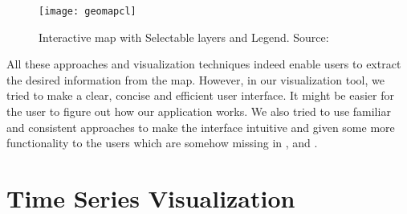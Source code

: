 \begin{figure} [H]
  \begin{center}
    \texttt{[image: geomapcl]}
    \caption{Interactive map with Selectable layers and Legend. Source:\cite{gportal2016}}
    \label{fig:mapgeo}
  \end{center}
\end{figure}

All these approaches and visualization techniques indeed enable users to extract the desired information from the map. However, in our visualization tool, we tried to make a clear, concise and efficient user interface. It might be easier for the user to figure out how our application works. We also tried to use familiar and consistent approaches to make the interface intuitive and given some more functionality to the users which are somehow missing in \cite{cbg2016}, \cite{wp2015} and \cite{gportal2016}. 

\section{Time Series Visualization}

